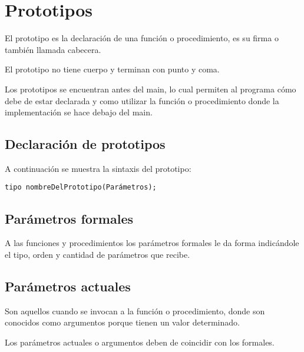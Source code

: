 \chapter[Prototipos]{Prototipos}
\raggedright
El prototipo es la declaración de una función o procedimiento, es su firma o también llamada cabecera.

\vspace{1em}
El prototipo no tiene cuerpo y terminan con punto y coma.

\vspace{1em}
{Los prototipos se encuentran antes del main, lo cual permiten al programa cómo debe de estar declarada y como utilizar la función o procedimiento donde la implementación se hace debajo del main.}

\section[Declaración]{Declaración de prototipos}
A continuación se muestra la sintaxis del prototipo:

\verb|tipo nombreDelPrototipo(Parámetros);|

\section[Parámetros formales]{Parámetros formales}
A las funciones y procedimientos los parámetros formales le da forma indicándole el tipo, orden y cantidad de parámetros que recibe.


\section[Parámetros actuales]{Parámetros actuales}
Son aquellos cuando se invocan a la función o procedimiento, donde son conocidos como argumentos porque tienen un valor determinado.

\vspace{1em}
Los parámetros actuales o argumentos deben de coincidir con los formales.
